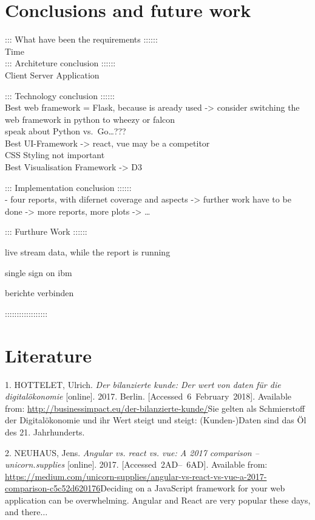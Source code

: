 \documentclass[american,a4paper,oneside,,tablecaptionabove]{scrbook}
\begin{document}
\chapter{Conclusions and future work}\label{conclusions-and-future-work}

::: What have been the requirements ::::::\\
Time\\
::: Architeture conclusion ::::::\\
Client Server Application

::: Technology conclusion ::::::\\
Best web framework = Flask, because is aready used -\textgreater{}
consider switching the web framework in python to wheezy or falcon\\
speak about Python vs.~Go\ldots{}???\\
Best UI-Framework -\textgreater{} react, vue may be a competitor\\
CSS Styling not important\\
Best Visualisation Framework -\textgreater{} D3

::: Implementation conclusion ::::::\\
- four reports, with difernet coverage and aspects -\textgreater{}
further work have to be done -\textgreater{} more reports, more plots
-\textgreater{} \ldots{}

::: Furthure Work ::::::

live stream data, while the report is running

single sign on ibm

berichte verbinden

::::::::::::::::::

\chapter*{Literature}\label{bibliography}

\hypertarget{refs}{}
\hypertarget{ref-Hottelet.2017}{}
1. HOTTELET, Ulrich. \emph{Der bilanzierte kunde: Der wert von daten für
die digitalökonomie} {[}online{]}. 2017. Berlin.
{[}Accessed~6~February~2018{]}. Available from:
\url{http://businessimpact.eu/der-bilanzierte-kunde/}Sie gelten als
Schmierstoff der Digitalökonomie und ihr Wert steigt und steigt:
(Kunden-)Daten sind das Öl des 21. Jahrhunderts.

\hypertarget{ref-Neuhaus.2017}{}
2. NEUHAUS, Jens. \emph{Angular vs. react vs. vue: A 2017 comparison --
unicorn.supplies} {[}online{]}. 2017. {[}Accessed~2AD--~6AD{]}.
Available from:
\url{https://medium.com/unicorn-supplies/angular-vs-react-vs-vue-a-2017-comparison-c5c52d620176}Deciding
on a JavaScript framework for your web application can be overwhelming.
Angular and React are very popular these days, and there\(\ldots\)
\end{document}
